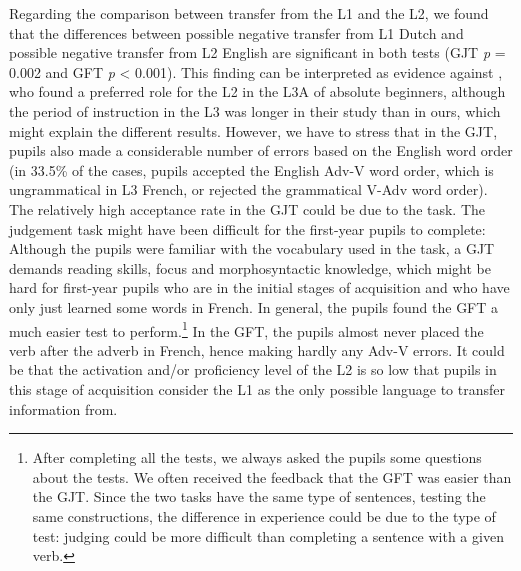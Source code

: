 \documentclass[output=paper,modfonts,nonflat, newtxmath]{langsci/langscibook}
\begin{document}
Regarding the comparison between transfer from the L1 and the L2, we found that the differences between possible negative transfer from L1 Dutch and possible negative transfer from L2 English are significant in both tests (GJT \textit{p} = 0.002 and GFT \textit{p} < 0.001). This finding can be interpreted as evidence against \citet{BardelFalk2007}, who found a preferred role for the L2 in the L3A of absolute beginners, although the period of instruction in the L3 was longer in their study than in ours, which might explain the different results. However, we have to stress that in the GJT, pupils also made a considerable number of errors based on the English word order (in 33.5\% of the cases, pupils accepted the English Adv-V word order, which is ungrammatical in L3 French, or rejected the grammatical V-Adv word order). The relatively high acceptance rate in the GJT could be due to the task. The judgement task might have been difficult for the first-year pupils to complete: Although the pupils were familiar with the vocabulary used in the task, a GJT demands reading skills, focus and morphosyntactic knowledge, which might be hard for first-year pupils who are in the initial stages of acquisition and who have only just learned some words in French. In general, the pupils found the GFT a much easier test to perform.\footnote{ \textrm{After completing all the tests, we always asked the pupils some questions about the tests. We often received the feedback that the GFT was easier than the GJT. Since the two tasks have the same type of sentences, testing the same constructions, the difference in experience could be due to the type of test: judging could be more difficult than completing a sentence with a given verb.} } In the GFT, the pupils almost never placed the verb after the adverb in French, hence making hardly any Adv-V errors. It could be that the activation and/or proficiency level of the L2 is so low that pupils in this stage of acquisition consider the L1 as the only possible language to transfer information from.
\end{document}
